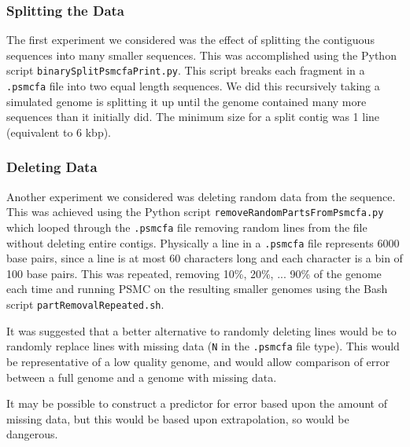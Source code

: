 \documentclass[11pt,a4paper]{article}
\begin{document}
\subsubsection{Splitting the Data}
The first experiment we considered was the effect of splitting the contiguous sequences into many smaller sequences. This was accomplished using the Python script \verb|binarySplitPsmcfaPrint.py|. This script breaks each fragment in a \verb|.psmcfa| file into two equal length sequences. We did this recursively taking a simulated genome is splitting it up until the genome contained many more sequences than it initially did. The minimum size for a split contig was 1 line (equivalent to 6 kbp).


\subsubsection{Deleting Data}
Another experiment we considered was deleting random data from the sequence. This was achieved using the Python script \verb|removeRandomPartsFromPsmcfa.py| which looped through the \verb|.psmcfa| file removing random lines from the file without deleting entire contigs. Physically a line in a \verb|.psmcfa| file represents 6000 base pairs, since a line is at most 60 characters long and each character is a bin of 100 base pairs. This was repeated, removing 10\%, 20\%, ... 90\% of the genome each time and running PSMC on the resulting smaller genomes using the Bash script \verb|partRemovalRepeated.sh|.

It was suggested that a better alternative to randomly deleting lines would be to randomly replace lines with missing data (\verb|N| in the \verb|.psmcfa| file type). This would be representative of a low quality genome, and would allow comparison of error between a full genome and a genome with missing data.

It may be possible to construct a predictor for error based upon the amount of missing data, but this would be based upon extrapolation, so would be dangerous.
\end{document}
